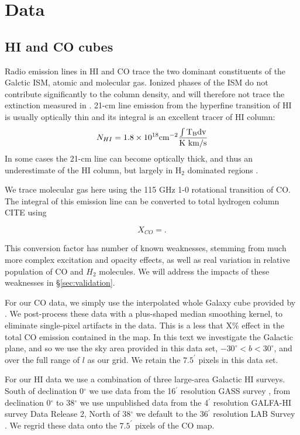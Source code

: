 \section{Data}
\label{sec:data}
\subsection{HI and CO cubes}

Radio emission lines in HI and CO trace the two dominant constituents of the Galctic ISM, atomic and molecular gas. Ionized phases of the ISM do not contribute significantly to the column density, and will therefore not trace the extinction measured in \cite{Green_2015}. 21-cm line emission from the hyperfine transition of HI is usually optically thin and its integral is an excellent tracer of HI column:
\begin{equation}
N_{HI} = 1.8 \times 10^{18} \rm cm^{-2} \frac{ \int T_B dv}{\rm K~km/s}
\end{equation}
In some cases the 21-cm line can become optically thick, and thus an underestimate of the HI column, but largely in H$_2$ dominated regions \cite{Goldsmith_2007}. 

We trace molecular gas here using the 115 GHz 1-0 rotational transition of CO. The integral of this emission line can be converted to total hydrogen column CITE using

\begin{equation}
X_{CO} = .
\end{equation}

This conversion factor has number of known weaknesses, stemming from much more complex excitation and opacity effects, as well as real variation in relative population of CO and $H_2$ molecules. We will address the impacts of these weaknesses in \S \ref{sec:validation}. 

For our CO data, we simply use the interpolated whole Galaxy cube provided by \cite{Dame_2001}. We post-process these data with a plus-shaped median smoothing kernel, to eliminate single-pixel artifacts in the data. This is a less that X\% effect in the total CO emission contained in the map. In this text we investigate the Galactic plane, and so we use the sky area provided in this data set, $-30^\circ < b < 30^\circ$, and over the full range of $l$ as our grid. We retain the $7.5^\prime$ pixels in this data set.

For our HI data we use a combination of three large-area Galactic HI surveys. South of declination 0$^\circ$ we use data from the 16$^\prime$ resolution GASS survey \cite{Kalberla_2010}, from declination 0$^\circ$ to 38$^\circ$ we use unpublished data from the 4$^\prime$ resolution GALFA-HI survey \cite{Peek_2011} Data Release 2, North of 38$^\circ$ we default to the 36$^\prime$ resolution LAB Survey \cite{Kalberla_2005}. We regrid these data onto the $7.5^\prime$ pixels of the \cite{Dame_2001} CO map. 


